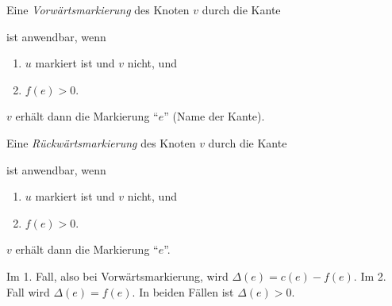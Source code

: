 \begin{beispiel}
\end{beispiel}


\begin{definition}

    Eine \emph{Vorwärtsmarkierung} des Knoten $v$ durch die Kante 
    ist anwendbar, wenn \begin{enumerate}
        \item $u$ markiert ist und $v$ nicht, und
        \item $f(e) > 0$.
    \end{enumerate}
    $v$ erhält dann die Markierung ``$e$'' (Name der Kante). 
    
    Eine \emph{Rückwärtsmarkierung} des Knoten $v$ durch die Kante 
    ist anwendbar, wenn \begin{enumerate}
        \item $u$ markiert ist und $v$ nicht, und
        \item $f(e) > 0$.
    \end{enumerate}
    $v$ erhält dann die Markierung ``$e$''. 

    Im 1. Fall, also bei Vorwärtsmarkierung, wird $\Delta(e) = c(e) - f(e)$. Im
    2. Fall wird $\Delta(e) = f(e)$. In beiden Fällen ist $\Delta(e) > 0$.
\end{definition}



